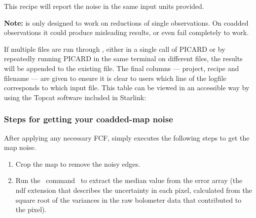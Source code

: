 \begin{terminalv}
\end{terminalv}
This recipe will report the noise in the same input units provided. 


\textbf{Note:}  is only designed to work on
reductions of single observations. On coadded observations it could
produce misleading results, or even fail completely to work.

If multiple files are run through , either in a single call
of PICARD or by repeatedly running PICARD in the same terminal on different
files, the results will be appended to the existing  file.
The final columns — project, recipe and filename — are given to ensure it
is clear to users which line of the logfile corresponds to which input file.
This table can be viewed in an accessible way by using the Topcat software
included in Starlink:

\begin{terminalv}
\end{terminalv}

\subsubsection*{Steps for getting your coadded-map noise}
After applying any necessary FCF,  simply
executes the following steps to get the map noise.

\begin{enumerate}
\item Crop the map to remove the noisy edges.

\begin{terminalv}
\end{terminalv}

\item Run the \Kappa\ command \stats\ to extract the median value from
the error array (the ndf extension that describes the uncertainty in each pixel, 
calculated from the square root of the variances in the raw bolometer data 
that contributed to the pixel).

\begin{terminalv}
\end{terminalv}

\end{enumerate}

